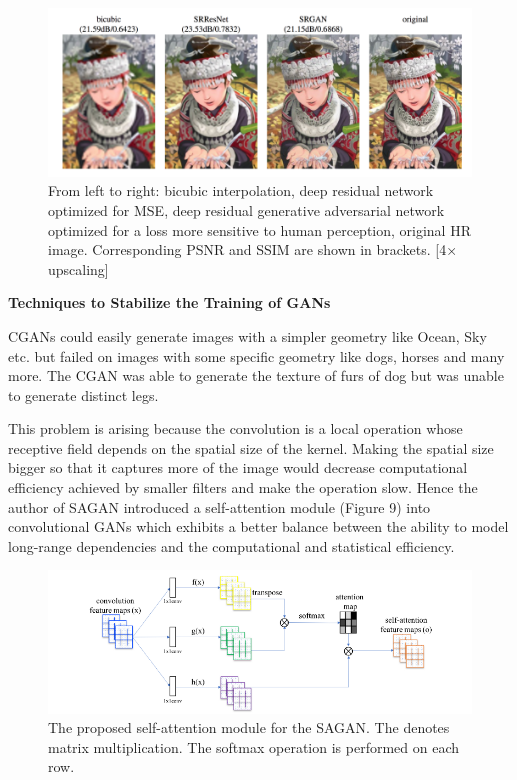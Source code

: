 \documentclass{article}
\begin{document}
\begin{figure}[h]
    \centering
    \includegraphics[width=1\textwidth]{images/special_srgan.png}
    \caption{From left to right: bicubic interpolation, deep residual network optimized for MSE, deep residual generative adversarial network optimized for a loss more sensitive to human perception, original HR image. Corresponding PSNR and SSIM are shown in brackets. [4× upscaling]}
    \label{fig:mesh1}
\end{figure}

\medskip
\begin{center}
    {\Large{\textbf{Techniques to Stabilize the Training of GANs}}}
\end{center}

CGANs could easily generate images with a simpler geometry like Ocean, Sky etc. but failed on images with some specific geometry like dogs, horses and many more. The CGAN was able to generate the texture of furs of dog but was unable to generate distinct legs.

This problem is arising because the convolution is a local operation whose receptive field depends on the spatial size of the kernel. Making the spatial size bigger so that it captures more of the image would decrease computational efficiency achieved by smaller filters and make the operation slow. Hence the author of SAGAN introduced a self-attention module (Figure 9) into convolutional GANs which  exhibits a better balance between the ability to model long-range dependencies and the computational and statistical efficiency. 


\begin{figure}[h]
    \centering
    \includegraphics[width=.7\textwidth]{images/stablize_sa.png}
    \caption{The proposed self-attention module for the SAGAN. The \optimes denotes matrix multiplication. The softmax operation is performed on each row.}
    \label{fig:mesh1}
\end{figure}
\end{document}
